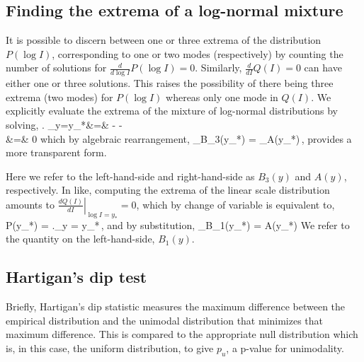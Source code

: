 \documentclass[11pt,a4paper,draft]{article}
\begin{document}
\subsection*{Finding the extrema of a log-normal mixture}
It is possible to discern between one or three extrema of the distribution $P(\log I)$, corresponding to one or two modes (respectively) by counting the number of solutions for $\frac{d}{d\log I}P(\log I) = 0$. Similarly, $\frac{d}{dI}Q(I)=0$ can have either one or three solutions. This raises the possibility of there being three extrema (two modes) for $P(\log I)$ whereas only one mode in $Q(I)$. We explicitly evaluate the extrema of the mixture of log-normal distributions by solving,
%
\bea \nonumber
  \left. \right\vert_{y=y_*}&=&
  -    -
    \nonumber\\
  &=& 0\nonumber
\eea
%
which by algebraic rearrangement,
%
\be 
  \label{eq:extremaP}
  _{B_3(y_*)} =
    _{A(y_*)}\,,
\ee
%
provides a more transparent form.  

Here we refer to the left-hand-side and right-hand-side as $B_3(y)$ and $A(y)$, respectively. In like, computing the extrema of the linear scale distribution amounts to $\left.\frac{d Q(I)}{dI} \right\vert_{\log I= y_*} = 0$, which by change of variable is equivalent to,
%
\be
\label{eq:QExtremaStrange}
P(y_*) = \left.\right\vert_{y = y_*}\,,
\ee
%
and by substitution,
%
\be
  \label{eq:extremaQ}
  _{B_1(y_*)} = A(y_*) 
\ee
%
We refer to the quantity on the left-hand-side, $B_1(y)$.

\subsection*{Hartigan's dip test}
Briefly, Hartigan's dip statistic measures the maximum difference between the empirical distribution and the unimodal distribution that minimizes that maximum difference. This is compared to the appropriate null distribution which is, in this case, the uniform distribution, to give $p_u$, a p-value for unimodality.
\end{document}

